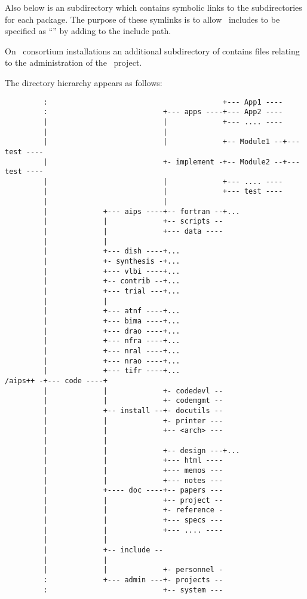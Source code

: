 Also below  is an  subdirectory which
contains symbolic links to the  subdirectories for each
package.  The purpose of these symlinks is to allow \aipspp\ includes to be
specified as ``'' by adding
\mbox{} to the include path.

On \aipspp\ consortium installations an additional  subdirectory
of  contains files relating to the administration of the
\aipspp\ project.

The  directory hierarchy appears as follows:

\begin{verbatim}
         :                                         +--- App1 ----
         :                           +--- apps ----+--- App2 ----
         |                           |             +--- .... ----
         |                           |
         |                           |             +-- Module1 --+--- test ----
         |                           +- implement -+-- Module2 --+--- test ----
         |                           |             +--- .... ----
         |                           |             +--- test ----
         |                           |
         |             +--- aips ----+-- fortran --+...
         |             |             +-- scripts --
         |             |             +--- data ----
         |             |
         |             +--- dish ----+...
         |             +- synthesis -+...
         |             +--- vlbi ----+...
         |             +-- contrib --+...
         |             +--- trial ---+...
         |             |
         |             +--- atnf ----+...
         |             +--- bima ----+...
         |             +--- drao ----+...
         |             +--- nfra ----+...
         |             +--- nral ----+...
         |             +--- nrao ----+...
         |             +--- tifr ----+...
/aips++ -+--- code ----+
         |             |             +- codedevl --
         |             |             +- codemgmt --
         |             +-- install --+- docutils --
         |             |             +- printer ---
         |             |             +-- <arch> ---
         |             |
         |             |             +-- design ---+...
         |             |             +--- html ----
         |             |             +--- memos ---
         |             |             +--- notes ---
         |             +---- doc ----+-- papers ---
         |             |             +-- project --
         |             |             +- reference -
         |             |             +--- specs ---
         |             |             +--- .... ----
         |             |
         |             +-- include --
         |             |
         |             |             +- personnel -
         :             +--- admin ---+- projects --
         :                           +-- system ---
\end{verbatim}

